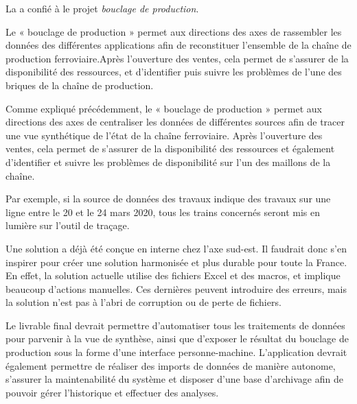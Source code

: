 La \sncf a confié à \entreprise le projet \emph{bouclage de production}.

Le « bouclage de production » permet aux directions des axes de rassembler les données des différentes applications afin de reconstituer l’ensemble de la chaîne de production ferroviaire.Après  l’ouverture  des  ventes,  cela  permet  de  s’assurer  de  la  disponibilité  des  ressources,  et d’identifier puis suivre les problèmes de l’une des briques de la chaîne de production.

Comme expliqué précédemment, le « bouclage de production » permet aux directions des axes \tgv de centraliser les données de différentes sources afin de tracer une vue synthétique de l'état de la chaîne ferroviaire. Après l'ouverture des ventes, cela permet de s'assurer de la disponibilité des ressources et également d'identifier et suivre les problèmes de disponibilité sur l'un des maillons de la chaîne.

Par exemple, si la source de données des travaux indique des travaux sur une ligne entre le 20 et le 24 mars 2020, tous les trains concernés seront mis en lumière sur l'outil de traçage.

Une solution a déjà été conçue en interne chez l'axe sud-est. Il faudrait donc s'en inspirer pour créer une solution harmonisée et plus durable pour toute la France. En effet, la solution actuelle utilise des fichiers Excel et des macros, et implique beaucoup d'actions manuelles. Ces dernières peuvent introduire des erreurs, mais la solution n'est pas à l'abri de corruption ou de perte de fichiers.

Le livrable final devrait permettre d'automatiser tous les traitements de données pour parvenir à la vue de synthèse, ainsi que d'exposer le résultat du bouclage de production sous la forme d'une interface personne-machine.
L'application devrait également permettre de réaliser des imports de données de manière autonome, s'assurer la maintenabilité du système et disposer d'une base d'archivage afin de pouvoir gérer l'historique et effectuer des analyses.
